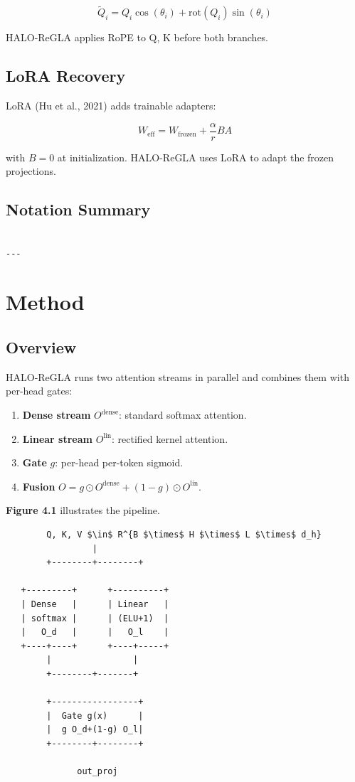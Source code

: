 \[
\tilde{Q}_i = Q_i \cos(\theta_i) + \mathrm{rot}(Q_i) \sin(\theta_i)
\]

HALO-ReGLA applies RoPE to Q, K before both branches.

\subsection{LoRA Recovery}

LoRA (Hu et al., 2021) adds trainable adapters:

\[
W_\text{eff} = W_\text{frozen} + \frac{\alpha}{r} B A
\]

with $B = 0$ at initialization. HALO-ReGLA uses LoRA to adapt the frozen 
projections.

\subsection{Notation Summary}

\begin{lstlisting}

---
\end{lstlisting}


\section{Method}

\subsection{Overview}

HALO-ReGLA runs two attention streams in parallel and combines them with 
per-head gates:

\begin{enumerate}
\item \textbf{Dense stream} $O^\text{dense}$: standard softmax attention.
\item \textbf{Linear stream} $O^\text{lin}$: rectified kernel attention.
\item \textbf{Gate} $g$: per-head per-token sigmoid.
\item \textbf{Fusion} $O = g \odot O^\text{dense} + (1 - g) \odot O^\text{lin}$.

\end{enumerate}
\textbf{Figure 4.1} illustrates the pipeline.

\begin{lstlisting}
        Q, K, V $\in$ R^{B $\times$ H $\times$ L $\times$ d_h}
                 |
        +--------+--------+
                           
   +---------+      +----------+
   | Dense   |      | Linear   |
   | softmax |      | (ELU+1)  |
   |   O_d   |      |   O_l    |
   +----+----+      +----+-----+
        |                |
        +--------+-------+
                  
        +-----------------+
        |  Gate g(x)      |
        |  g O_d+(1-g) O_l|
        +--------+--------+
                  
              out_proj
\end{lstlisting}

